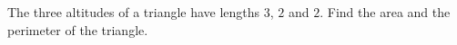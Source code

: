 The three altitudes of a triangle have lengths $3$, $2$ and $2$. Find the area and the perimeter of the triangle.
